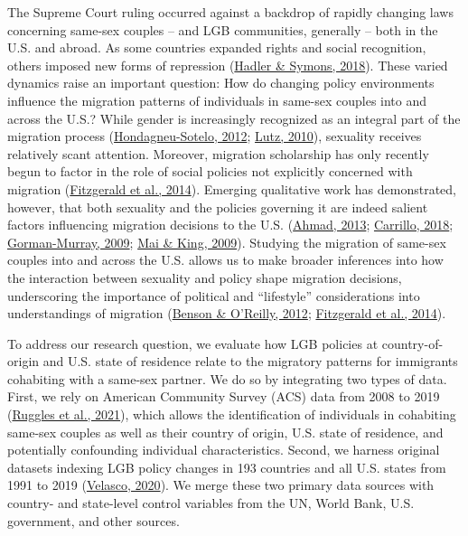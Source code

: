 \documentclass[
  11pt,
]{article}
\begin{document}
The Supreme Court ruling occurred against a backdrop of rapidly changing laws concerning same-sex couples -- and LGB communities, generally -- both in the U.S. and abroad. As some countries expanded rights and social recognition, others imposed new forms of repression (\protect\hyperlink{ref-hadler_2018_world}{Hadler \& Symons, 2018}). These varied dynamics raise an important question: How do changing policy environments influence the migration patterns of individuals in same-sex couples into and across the U.S.? While gender is increasingly recognized as an integral part of the migration process (\protect\hyperlink{ref-hondagneu-sotelo_2012}{Hondagneu-Sotelo, 2012}; \protect\hyperlink{ref-lutz_2010}{Lutz, 2010}), sexuality receives relatively scant attention. Moreover, migration scholarship has only recently begun to factor in the role of social policies not explicitly concerned with migration (\protect\hyperlink{ref-fitzgerald_2014}{Fitzgerald et al., 2014}). Emerging qualitative work has demonstrated, however, that both sexuality and the policies governing it are indeed salient factors influencing migration decisions to the U.S. (\protect\hyperlink{ref-ahmad_2013}{Ahmad, 2013}; \protect\hyperlink{ref-carrillo_2018}{Carrillo, 2018}; \protect\hyperlink{ref-gorman-murray_2009}{Gorman-Murray, 2009}; \protect\hyperlink{ref-mai_2009}{Mai \& King, 2009}). Studying the migration of same-sex couples into and across the U.S. allows us to make broader inferences into how the interaction between sexuality and policy shape migration decisions, underscoring the importance of political and ``lifestyle'' considerations into understandings of migration (\protect\hyperlink{ref-benson_2012}{Benson \& O'Reilly, 2012}; \protect\hyperlink{ref-fitzgerald_2014}{Fitzgerald et al., 2014}).

To address our research question, we evaluate how LGB policies at country-of-origin and U.S. state of residence relate to the migratory patterns for immigrants cohabiting with a same-sex partner. We do so by integrating two types of data. First, we rely on American Community Survey (ACS) data from 2008 to 2019 (\protect\hyperlink{ref-ruggles_2021}{Ruggles et al., 2021}), which allows the identification of individuals in cohabiting same-sex couples as well as their country of origin, U.S. state of residence, and potentially confounding individual characteristics. Second, we harness original datasets indexing LGB policy changes in 193 countries and all U.S. states from 1991 to 2019 (\protect\hyperlink{ref-velasco_2020}{Velasco, 2020}). We merge these two primary data sources with country- and state-level control variables from the UN, World Bank, U.S. government, and other sources.
\end{document}
